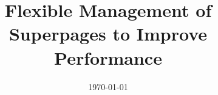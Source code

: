 \documentclass[a4paper, 11pt, oneside]{Thesis}  %
\begin{document}
\frontmatter      %

\title  {Flexible Management of Superpages to Improve Performance}
\addresses  {\groupname\\\deptname\\\univname}  %
\date       {\today}
\subject    {}
\keywords   {}

\maketitle


\fancyhead{}  %
\rhead{\thepage}  %
\lhead{}  %

\pagestyle{fancy}  %

\clearpage
\end{document}
